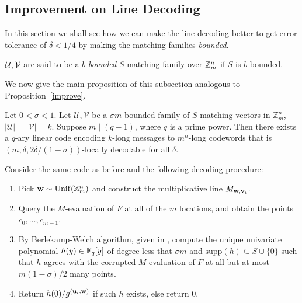 \subsection{Improvement on Line Decoding}

In this section we shall see how we can make the line decoding better to get error tolerance of $\delta<1/4$ by making the matching families \emph{bounded}. 

\begin{definition}
    $\mathcal{U}, \mathcal{V}$ are said to be a $b$-\emph{bounded} $S$-matching family over $\mathbb{Z}_m^n$ if $S$ is $b$-bounded.
\end{definition}

We now give the main proposition of this subsection analogous to Proposition~\ref{improve}.

\begin{greybox}
\begin{proposition}
Let $0 < \sigma < 1$. Let $\mathcal{U},\mathcal{V}$ be a $\sigma m$-bounded family of $S$-matching vectors in $\mathbb{Z}_m^n$, $|\mathcal{U}| = |\mathcal{V}| = k$. Suppose $m \mid (q-1)$, where $q$ is a prime power. Then there exists a $q$-ary linear code encoding $k$-long messages to $m^n$-long codewords that is $(m,\delta,2\delta/(1-\sigma))$-locally decodable for all $\delta$.
\end{proposition}
\end{greybox}

Consider the same code as before and the following decoding procedure:
\begin{enumerate}
    \item Pick $\mathbf{w}\sim\mathrm{Unif}(\mathbb{Z}_m^n)$ and construct the multiplicative line $M_{\mathbf{w}, \mathbf{v}_i}$.
    \item Query the $M$-evaluation of $F$ at all of the $m$ locations, and obtain the points $c_0,\ldots,c_{m-1}$. 
    \item By Berlekamp-Welch algorithm, given in \cite{GRS25}, compute the unique univariate polynomial $h(y)\in\mathbb{F}_q[y]$ of degree less that $\sigma m$ and $\mathrm{supp}(h)\subseteq S\cup\{0\}$ such that $h$ agrees with the corrupted $M$-evaluation of $F$ at all but at most $m(1-\sigma)/2$ many points.
    \item Return $h(0)/g^{(\mathbf{u}_i, \mathbf{w})}$ if such $h$ exists, else return $0$.
\end{enumerate}


